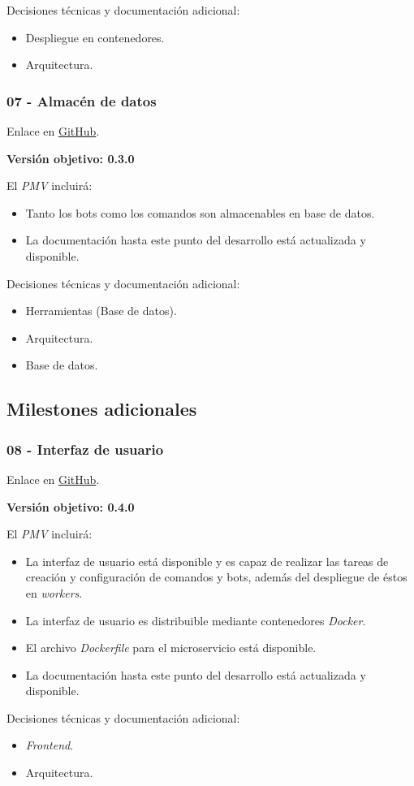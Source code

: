 Decisiones técnicas y documentación adicional:

\begin{itemize}
	\item Despliegue en contenedores.
	\item Arquitectura.
\end{itemize}

\subsubsection{07 - Almacén de datos}

Enlace en \href{https://github.com/harvestcore/matroos/milestone/11}{GitHub}.

\textbf{Versión objetivo: 0.3.0}


El \textit{PMV} incluirá:

\begin{itemize}
	\item Tanto los bots como los comandos son almacenables en base de datos.
	\item La documentación hasta este punto del desarrollo está actualizada y disponible.
\end{itemize}

Decisiones técnicas y documentación adicional:

\begin{itemize}
	\item Herramientas (Base de datos).
	\item Arquitectura.
	\item Base de datos.
\end{itemize}

\subsection{Milestones adicionales}

\subsubsection{08 - Interfaz de usuario}

Enlace en \href{https://github.com/harvestcore/matroos/milestone/9}{GitHub}.

\textbf{Versión objetivo: 0.4.0}


El \textit{PMV} incluirá:

\begin{itemize}
	\item La interfaz de usuario está disponible y es capaz de realizar las tareas de creación y configuración de comandos y bots, además del despliegue de éstos en \textit{workers}.
	\item La interfaz de usuario es distribuible mediante contenedores \textit{Docker}.
	\item El archivo \textit{Dockerfile} para el microservicio está disponible.
	\item La documentación hasta este punto del desarrollo está actualizada y disponible.
\end{itemize}

Decisiones técnicas y documentación adicional:

\begin{itemize}
	\item \textit{Frontend}.
	\item Arquitectura.
\end{itemize}
